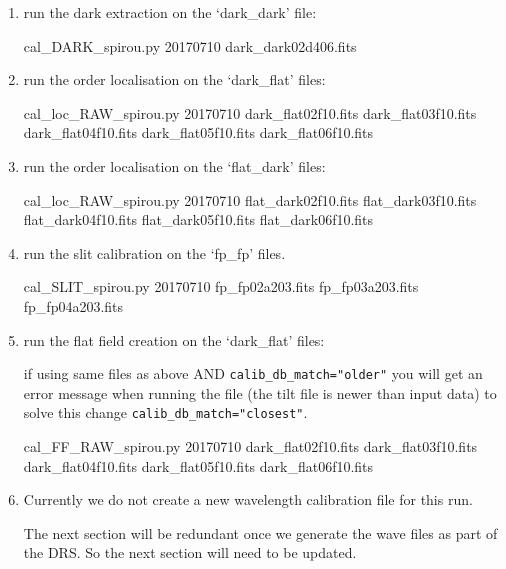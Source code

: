 \begin{enumerate}

\item run the dark extraction on the `dark\_dark' file:
\begin{cmdbox}
cal_DARK_spirou.py 20170710 dark_dark02d406.fits
\end{cmdbox}

\item run the order localisation on the `dark\_flat' files:
\begin{cmdbox}
cal_loc_RAW_spirou.py 20170710 dark_flat02f10.fits dark_flat03f10.fits dark_flat04f10.fits dark_flat05f10.fits dark_flat06f10.fits
\end{cmdbox}

\item run the order localisation on the `flat\_dark' files:
\begin{cmdbox}
cal_loc_RAW_spirou.py 20170710 flat_dark02f10.fits flat_dark03f10.fits flat_dark04f10.fits flat_dark05f10.fits flat_dark06f10.fits
\end{cmdbox}

\item run the slit calibration on the `fp\_fp' files.
\begin{cmdbox}
cal_SLIT_spirou.py 20170710 fp_fp02a203.fits fp_fp03a203.fits fp_fp04a203.fits
\end{cmdbox}

\item run the flat field creation on the `dark\_flat' files:

\begin{note}
if using same files as above AND \lstinline[style=pythoninline]|calib_db_match="older"| you will get an error message when running the file (the tilt file is newer than input data) to solve this change \lstinline[style=pythoninline]|calib_db_match="closest"|.
\end{note}

\begin{cmdbox}
cal_FF_RAW_spirou.py 20170710 dark_flat02f10.fits dark_flat03f10.fits dark_flat04f10.fits dark_flat05f10.fits dark_flat06f10.fits
\end{cmdbox}


\item Currently we do not create a new wavelength calibration file for this run. 

\ifdevguide
\begin{todo}
The next section will be redundant once we generate the wave files as part of the DRS. So the next section will need to be updated.
\end{todo}
\fi


\end{enumerate}
